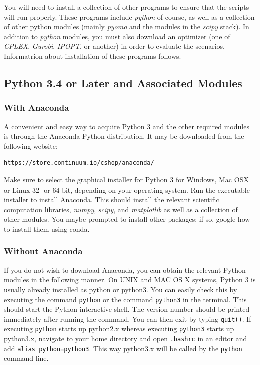 \documentclass[11pt]{article}
\begin{document}
You will need to install a collection of other programs to ensure that the scripts will run properly. These programs include \textit{python} of course, as well as a collection of other python modules (mainly \textit{pyomo} and the modules in the \textit{scipy} stack). In addition to \textit{python} modules, you must also download an optimizer (one of \textit{CPLEX}, \textit{Gurobi}, \textit{IPOPT}, or another) in order to evaluate the scenarios. Informatrion about installation of these programs follows.

\newcommand{\code}[1]{\textmd{\texttt{#1}}}

\subsection{Python 3.4 or Later and Associated Modules}
\subsubsection{With Anaconda}
A convenient and easy way to acquire Python 3 and the other required modules is through the Anaconda Python distribution. It may be downloaded from the following website:
\begin{verbatim}
https://store.continuum.io/cshop/anaconda/
\end{verbatim}
Make sure to select the graphical installer for Python 3 for Windows, Mac OSX or Linux 32- or 64-bit, depending on your operating system. Run the executable installer to install Anaconda.
This should install the relevant scientific computation libraries, \textit{numpy}, \textit{scipy}, and \textit{matplotlib} as well as a collection of other modules. You maybe prompted to install other packages; if so, google how to install them using conda.


\subsubsection{Without Anaconda}

If you do not wish to download Anaconda, you can obtain the relevant Python modules in the following manner.
On UNIX and MAC OS X systems, Python 3 is usually already installed as python or python3. You can easily check this by 
executing the command \texttt{python} or the command \texttt{python3} in the terminal.
This should start the Python interactive shell. The version number should be printed immediately after running the command. You can then exit by typing \texttt{quit()}.
If executing \texttt{python} starts up python2.x whereas executing \texttt{python3} starts up python3.x, navigate to your home directory and open 
\texttt{.bashrc} in an editor and add \texttt{alias python=python3}. 
This way python3.x will be called by the \texttt{python} command line. 
\end{document}
